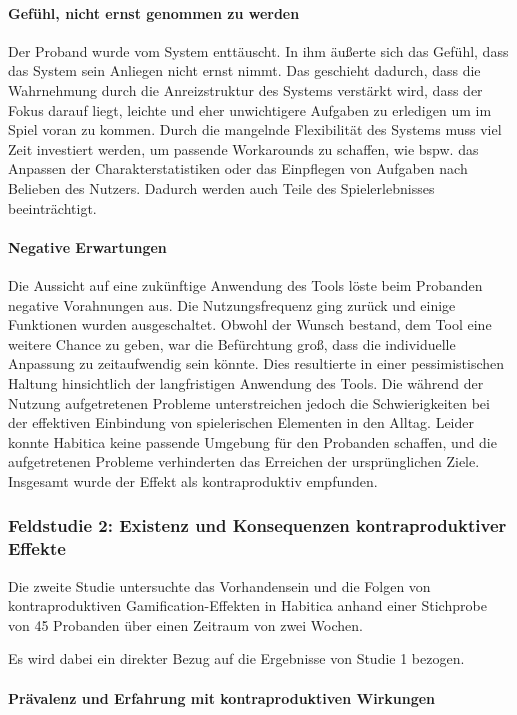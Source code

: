 \documentclass[sigconf, nonacm]{acmart}
\begin{document}
\paragraph{Gefühl, nicht ernst genommen zu werden}\label{sec:sr2}
Der Proband wurde vom System enttäuscht. In ihm äußerte sich das Gefühl, dass das System sein Anliegen nicht ernst nimmt. Das geschieht dadurch, dass die Wahrnehmung durch die Anreizstruktur des Systems verstärkt wird, dass der Fokus darauf liegt, leichte und eher unwichtigere Aufgaben zu erledigen um im Spiel voran zu kommen. 
Durch die mangelnde Flexibilität des Systems muss viel Zeit investiert werden, um passende Workarounds zu schaffen, wie bspw. das Anpassen der Charakterstatistiken oder das Einpflegen von Aufgaben nach Belieben des Nutzers. Dadurch werden auch Teile des Spielerlebnisses beeinträchtigt.

\paragraph{Negative Erwartungen}\label{sec:sr3}
Die Aussicht auf eine zukünftige Anwendung des Tools löste beim Probanden negative Vorahnungen aus. Die Nutzungsfrequenz ging zurück und einige Funktionen wurden ausgeschaltet. Obwohl der Wunsch bestand, dem Tool eine weitere Chance zu geben, war die Befürchtung groß, dass die individuelle Anpassung zu zeitaufwendig sein könnte. Dies resultierte in einer pessimistischen Haltung hinsichtlich der langfristigen Anwendung des Tools. Die während der Nutzung aufgetretenen Probleme unterstreichen jedoch die Schwierigkeiten bei der effektiven Einbindung von spielerischen Elementen in den Alltag. Leider konnte Habitica keine passende Umgebung für den Probanden schaffen, und die aufgetretenen Probleme verhinderten das Erreichen der ursprünglichen Ziele. Insgesamt wurde der Effekt als kontraproduktiv empfunden.

\subsubsection{Feldstudie 2: Existenz und Konsequenzen kontraproduktiver Effekte}
Die zweite Studie untersuchte das Vorhandensein und die Folgen von kontraproduktiven Gamification-Effekten in Habitica anhand einer Stichprobe von 45 Probanden über einen Zeitraum von zwei Wochen.

Es wird dabei ein direkter Bezug auf die Ergebnisse von Studie 1 bezogen.

\paragraph{Prävalenz und Erfahrung mit kontraproduktiven Wirkungen}
\end{document}
